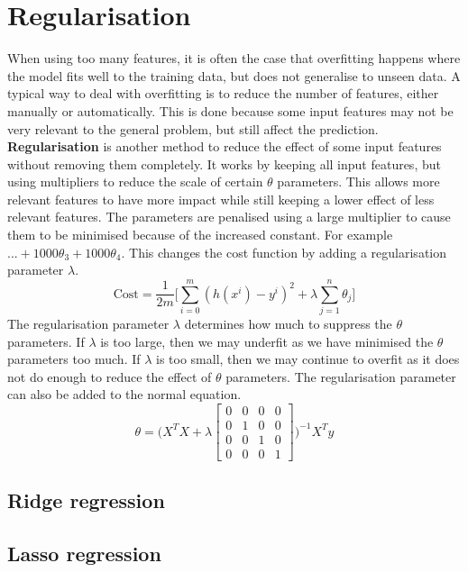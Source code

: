 \documentclass[CS5104-Notes.tex]{subfiles}
\begin{document}
\section{Regularisation}
When using too many features, it is often the case that overfitting happens where the model fits well to the training data, but does not generalise to unseen data. A typical way to deal with overfitting is to reduce the number of features, either manually or automatically. This is done because some input features may not be very relevant to the general problem, but still affect the prediction. 
\n
\textbf{Regularisation} is another method to reduce the effect of some input features without removing them completely. It works by keeping all input features, but using multipliers to reduce the scale of certain $\theta$ parameters. This allows more relevant features to have more impact while still keeping a lower effect of less relevant features. The parameters are penalised using a large multiplier to cause them to be minimised because of the increased constant. For example $... + 1000\theta_{3} + 1000\theta_{4}$. This changes the cost function by adding a regularisation parameter $\lambda$.
\begin{equation}
\text{Cost} = \frac{1}{2m}\bigg[\sum_{i=0}^{m}(h(x^{i}) - y^{i})^{2} + \lambda \sum_{j=1}^{n}\theta_{j} \bigg]
\end{equation}
The regularisation parameter $\lambda$ determines how much to suppress the $\theta$ parameters. If $\lambda$ is too large, then we may underfit as we have minimised the $\theta$ parameters too much. If $\lambda$ is too small, then we may continue to overfit as it does not do enough to reduce the effect of $\theta$ parameters. 
\n
The regularisation parameter can also be added to the normal equation.
\begin{equation}
\theta = \Bigg( X^{T}X + \lambda \begin{bmatrix} 
	0 & 0 & 0 & 0 \\
	0 & 1 & 0 & 0 \\
	0 & 0 & 1 & 0 \\
	0 & 0 & 0 & 1
\end{bmatrix}  \Bigg)^{-1}X^{T}y
\end{equation}

\subsection{Ridge regression}

\subsection{Lasso regression}
\end{document}

